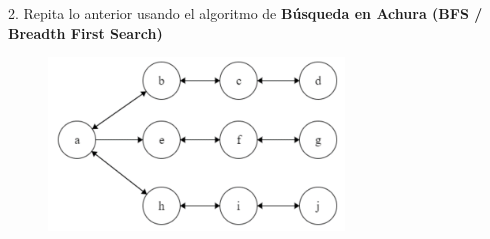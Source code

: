 2.	Repita lo anterior usando el algoritmo de \textbf{Búsqueda en Achura (BFS / Breadth First Search)}

\begin{figure}[htbp]
        \centering
    \includegraphics[width=0.7\textwidth]{imagenes/GrafoPrueba.png}
\end{figure}

